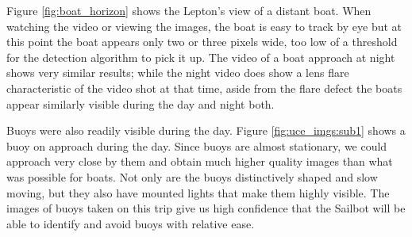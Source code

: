 Figure \ref{fig:boat_horizon} shows the Lepton's view of a distant boat. When watching the video or viewing the images, the boat is easy to track by eye but at this point the boat appears only two or three pixels wide, too low of a threshold for the detection algorithm to pick it up. The video of a boat approach at night shows very similar results; while the night video does show a lens flare characteristic of the video shot at that time, aside from the flare defect the boats appear similarly visible during the day and night both. 

Buoys were also readily visible during the day. Figure \ref{fig:uce_imgs:sub1} shows a buoy on approach during the day. Since buoys are almost stationary, we could approach very close by them and obtain much higher quality images than what was possible for boats. Not only are the buoys distinctively shaped and slow moving, but they also have mounted lights that make them highly visible. The images of buoys taken on this trip give us high confidence that the Sailbot will be able to identify and avoid buoys with relative ease.

